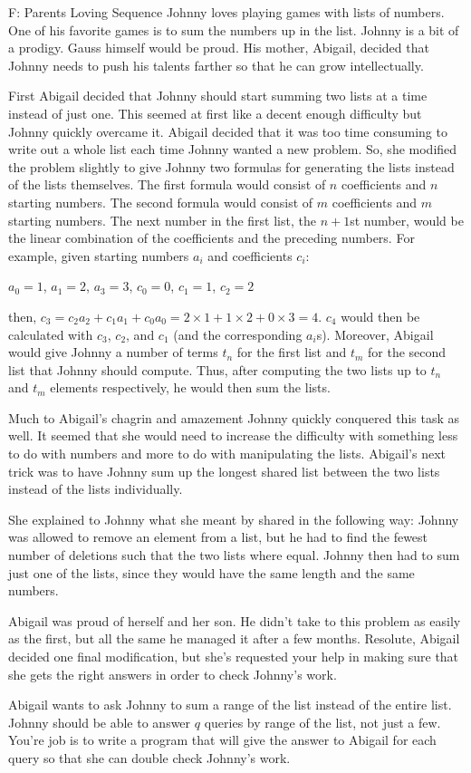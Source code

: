 \begin{problem}{F: Parents Loving Sequence}
Johnny loves playing games with lists of numbers.
One of his favorite games is to sum the numbers up in the list.
Johnny is a bit of a prodigy.
Gauss himself would be proud.
His mother, Abigail, decided that Johnny needs to push his talents farther so that he can grow intellectually.

First Abigail decided that Johnny should start summing two lists at a time instead of just one.
This seemed at first like a decent enough difficulty but Johnny quickly overcame it.
Abigail decided that it was too time consuming to write out a whole list each time Johnny wanted a new problem.
So, she modified the problem slightly to give Johnny two formulas for generating the lists instead of the lists themselves.
The first formula would consist of $n$ coefficients and $n$ starting numbers.
The second formula would consist of $m$ coefficients and $m$ starting numbers.
The next number in the first list, the $n+1$st number, would be the linear combination of the coefficients and the preceding numbers.
For example, given starting numbers $a_i$ and coefficients $c_i$:

$a_0 = 1$, $a_1 = 2$, $a_3 = 3$, $c_0 = 0$, $c_1 = 1$, $c_2 = 2$

then, $c_3 = c_2a_2 + c_1a_1 + c_0a_0 = 2\times 1 + 1\times 2 + 0\times 3 = 4$.
$c_4$ would then be calculated with $c_3$, $c_2$, and $c_1$ (and the corresponding $a_i$s).
Moreover, Abigail would give Johnny a number of terms $t_n$ for the first list and $t_m$ for the second list that Johnny should compute.
Thus, after computing the two lists up to $t_n$ and $t_m$ elements respectively, he would then sum the lists.

Much to Abigail's chagrin and amazement Johnny quickly conquered this task as well.
It seemed that she would need to increase the difficulty with something less to do with numbers and more to do with manipulating the lists.
Abigail's next trick was to have Johnny sum up the longest shared list between the two lists instead of the lists individually.

She explained to Johnny what she meant by shared in the following way:
Johnny was allowed to remove an element from a list, but he had to find the fewest number of deletions such that the two lists where equal.
Johnny then had to sum just one of the lists, since they would have the same length and the same numbers.

Abigail was proud of herself and her son.
He didn't take to this problem as easily as the first, but all the same he managed it after a few months.
Resolute, Abigail decided one final modification, but she's requested your help in making sure that she gets the right answers in order to check Johnny's work.

Abigail wants to ask Johnny to sum a range of the list instead of the entire list.
Johnny should be able to answer $q$ queries by range of the list, not just a few.
You're job is to write a program that will give the answer to Abigail for each query so that she can double check Johnny's work.
\end{problem}
